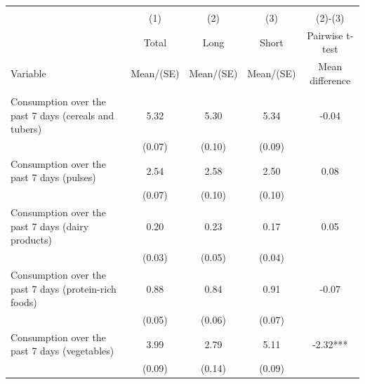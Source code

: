 
\begin{tabular}{@{\extracolsep{5pt}}lcccc}
\\[-1.8ex]\hline \hline \\[-1.8ex]
 & \multicolumn{1}{c}{(1)}  & \multicolumn{1}{c}{(2)}  & \multicolumn{1}{c}{(3)}  & \multicolumn{1}{c}{(2)-(3)} \\
 & \multicolumn{1}{c}{Total}  & \multicolumn{1}{c}{Long}  & \multicolumn{1}{c}{Short}  & \multicolumn{1}{c}{Pairwise t-test}  \\
Variable & Mean/(SE) & Mean/(SE) & Mean/(SE) & Mean difference \\ \hline \\[-1.8ex] 
Consumption over the past 7 days (cereals and tubers)   & 5.32    & 5.30    & 5.34    & -0.04   \\
 & (0.07)  & (0.10)  & (0.09)  &  \\ [1ex]
Consumption over the past 7 days (pulses)   & 2.54    & 2.58    & 2.50    & 0.08   \\
 & (0.07)  & (0.10)  & (0.10)  &  \\ [1ex]
Consumption over the past 7 days (dairy products)   & 0.20    & 0.23    & 0.17    & 0.05   \\
 & (0.03)  & (0.05)  & (0.04)  &  \\ [1ex]
Consumption over the past 7 days (protein-rich foods)   & 0.88    & 0.84    & 0.91    & -0.07   \\
 & (0.05)  & (0.06)  & (0.07)  &  \\ [1ex]
Consumption over the past 7 days (vegetables)   & 3.99    & 2.79    & 5.11    & -2.32***   \\
 & (0.09)  & (0.14)  & (0.09)  &  \\ [1ex]

\end{tabular}
